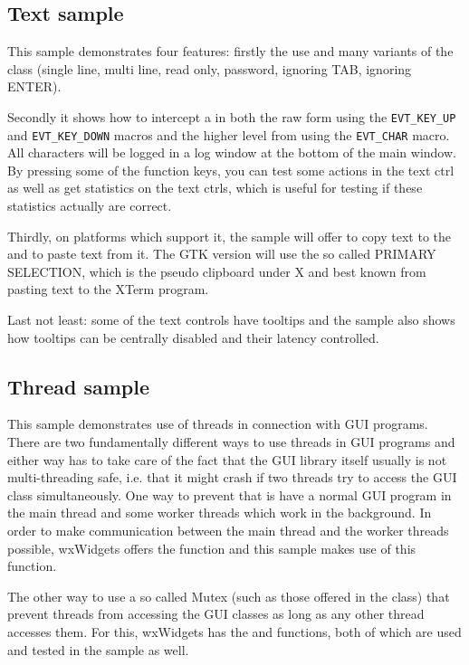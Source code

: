 \subsection{Text sample}\label{sampletext}

This sample demonstrates four features: firstly the use and many variants of
the  class (single line, multi line, read only,
password, ignoring TAB, ignoring ENTER).

Secondly it shows how to intercept a  in both
the raw form using the {\tt EVT\_KEY\_UP} and {\tt EVT\_KEY\_DOWN} macros and the
higher level from using the {\tt EVT\_CHAR} macro. All characters will be logged
in a log window at the bottom of the main window. By pressing some of the function
keys, you can test some actions in the text ctrl as well as get statistics on the
text ctrls, which is useful for testing if these statistics actually are correct.

Thirdly, on platforms which support it, the sample will offer to copy text to the
 and to paste text from it. The GTK version will
use the so called PRIMARY SELECTION, which is the pseudo clipboard under X and
best known from pasting text to the XTerm program.

Last not least: some of the text controls have tooltips and the sample also shows
how tooltips can be centrally disabled and their latency controlled.


\subsection{Thread sample}\label{samplethread}

This sample demonstrates use of threads in connection with GUI programs.
There are two fundamentally different ways to use threads in GUI programs and
either way has to take care of the fact that the GUI library itself usually
is not multi-threading safe, i.e. that it might crash if two threads try to
access the GUI class simultaneously. One way to prevent that is have a normal
GUI program in the main thread and some worker threads which work in the
background. In order to make communication between the main thread and the
worker threads possible, wxWidgets offers the 
function and this sample makes use of this function.

The other way to use a so called Mutex (such as those offered in the 
class) that prevent threads from accessing the GUI classes as long as any other
thread accesses them. For this, wxWidgets has the 
and  functions, both of which are
used and tested in the sample as well.

